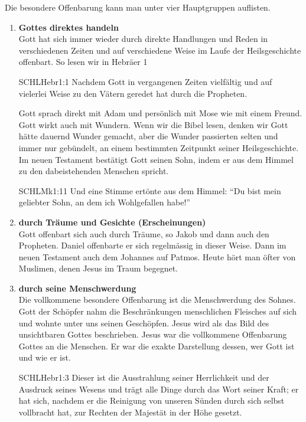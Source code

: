 \begin{otsblock}
    Die besondere Offenbarung kann man unter vier Hauptgruppen auflisten. 
    \begin{enumerate}
        \item \textbf{Gottes direktes handeln}\\
        Gott hat sich immer wieder durch direkte Handlungen und Reden in verschiedenen Zeiten und auf verschiedene Weise im Laufe der Heilsgeschichte offenbart. So lesen wir in Hebräer 1
        \begin{bibelbox}{SCHL}{Hebr}{1:1}
            Nachdem Gott in vergangenen Zeiten vielfältig und auf vielerlei Weise zu den Vätern geredet hat durch die Propheten.
        \end{bibelbox}
        Gott sprach direkt mit Adam und persönlich mit Mose wie mit einem Freund.\\
        Gott wirkt auch mit Wundern. Wenn wir die Bibel lesen, denken wir Gott hätte dauernd Wunder gemacht, aber die Wunder passierten selten und immer nur gebündelt, an einem bestimmten Zeitpunkt seiner Heilsgeschichte.\\
        Im neuen Testament bestätigt Gott seinen Sohn, indem er aus dem Himmel zu den dabeistehenden Menschen spricht.
        \begin{bibelbox}{SCHL}{Mk}{1:11}
            Und eine Stimme ertönte aus dem Himmel: \enquote{Du bist mein geliebter Sohn, an dem ich Wohlgefallen habe!}
        \end{bibelbox}
        \item \textbf{durch Träume und Gesichte (Erscheinungen)}\\
        Gott offenbart sich auch durch Träume, so \zB Jakob und dann auch den Propheten. Daniel offenbarte er sich regelmässig in dieser Weise. Dann im neuen Testament auch dem Johannes auf Patmos. Heute hört man öfter von Muslimen, denen Jesus im Traum begegnet.
        \item \textbf{durch seine Menschwerdung}\\
        Die vollkommene besondere Offenbarung ist die Menschwerdung des Sohnes. Gott der Schöpfer nahm die Beschränkungen menschlichen Fleisches auf sich und wohnte unter uns seinen Geschöpfen. Jesus wird als das Bild des unsichtbaren Gottes beschrieben. Jesus war die vollkommene Offenbarung Gottes an die Menschen. Er war die exakte Darstellung dessen, wer Gott ist und wie er ist.
        \begin{bibelbox}{SCHL}{Hebr}{1:3}
            Dieser ist die Ausstrahlung seiner Herrlichkeit und der Ausdruck seines Wesens und trägt alle Dinge durch das Wort seiner Kraft; er hat sich, nachdem er die Reinigung von unseren Sünden durch sich selbst vollbracht hat, zur Rechten der Majestät in der Höhe gesetzt.

\end{bibelbox}
\end{enumerate}
\end{otsblock}
